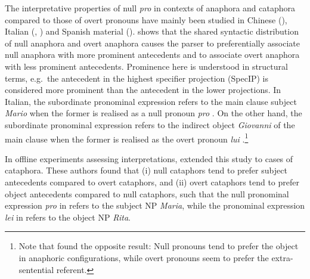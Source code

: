 \documentclass[output=paper,colorlinks,citecolor=brown]{langscibook}
\begin{document}
The interpretative properties of null \textit{pro} in contexts of anaphora and cataphora compared to those of overt pronouns have mainly been studied in Chinese (\citealt{yulong2007, zhiyi2019}), Italian (\citealt{carminati2002}, \citeyear{carminati2005, fedele2014}) and Spanish material (\citealt{alonso2002}). \citet{carminati2002} shows that the shared syntactic distribution of null anaphora and overt anaphora causes the parser to preferentially associate null anaphora with more prominent antecedents and to associate overt anaphora with less prominent antecedents. Prominence here is understood in structural terms, e.g.\, the antecedent in the highest specifier projection (SpecIP) is considered more prominent than the antecedent in the lower projections. In Italian, the subordinate pronominal expression refers to the main clause subject \textit{Mario} when the former is realised as a null pronoun \textit{pro} . On the other hand, the subordinate pronominal expression refers to the indirect object \textit{Giovanni} of the main clause when the former is realised as the overt pronoun \textit{lui} .\footnote{Note that \citet{belletti2007} found the opposite result: Null pronouns tend to prefer the object in anaphoric configurations, while overt pronouns seem to prefer the extra-sentential referent.}\largerpage[-1]

\ea \label{ste-pav:ex:mario-telefonato-giovanni}
 \label{ste-pav:ex:mario-telefonato-giovanni-a}
 \label{ste-pav:ex:mario-telefonato-giovanni-b}
\z
\z

\noindent In offline experiments assessing interpretations, \citet{fedele2014} extended this study to cases of cataphora. These authors found that (i) null cataphors tend to prefer subject antecedents compared to overt cataphors, and (ii) overt cataphors tend to prefer object antecedents compared to null cataphors, such that the null pronominal expression \textit{pro} in  refers to the subject NP \textit{Maria}, while the pronominal expression \textit{lei} in  refers to the object NP \textit{Rita}.
\end{document}
